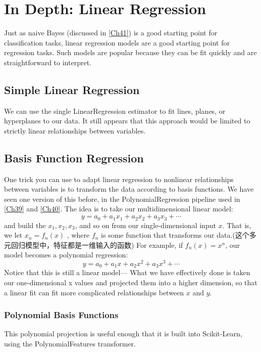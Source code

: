 \chapter{In Depth: Linear Regression\label{Ch42}}
Just as naive Bayes (discussed in \autoref{Ch41}) is a good starting point for classification
tasks, linear regression models are a good starting point for regression tasks. Such
models are popular because they can be fit quickly and are straightforward to interpret.
\section{Simple Linear Regression}
We can use the single LinearRegression estimator to fit lines, planes, or
hyperplanes to our data. It still appears that this approach would be limited to strictly
linear relationships between variables.

\section{Basis Function Regression}
One trick you can use to adapt linear regression to nonlinear relationships between variables is to transform the data according to basis functions. We have seen one version of this before, in the PolynomialRegression pipeline used in \autoref{Ch39} and \autoref{Ch40}. The idea is to take our multidimensional linear model:
\begin{equation*}
    y = a_0 + a_1x_1 + a_2x_2 + a_3x_3 +\cdots
\end{equation*}
and build the $x_1, x_2, x_3$, and so on from our single-dimensional input $x$. That is, we let
$x_n = f_n(x)$ , where $f_n$ is some function that transforms our data.(这个多元回归模型中，特征都是一维输入的函数) For example, if $f_n(x) = x^n$, our model becomes a polynomial regression:
\begin{equation*}
    y = a_0 + a_1x + a_2x^2 + a_3x^3 +\cdots
\end{equation*}
Notice that this is still a linear model— What we have effectively done is taken
our one-dimensional x values and projected them into a higher dimension, so that a linear fit can fit more complicated relationships between $x$ and $y$.

\subsection*{Polynomial Basis Functions}
This polynomial projection is useful enough that it is built into Scikit-Learn, using the PolynomialFeatures transformer.

